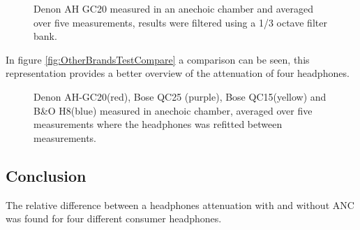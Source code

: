 \begin{figure}[H]
	\centering
	
	\caption{Denon AH GC20 measured in an anechoic chamber and averaged over five measurements, results were filtered using a 1/3 octave filter bank.}
	\label{fig:DenonComp}
\end{figure}

In figure \autoref{fig:OtherBrandsTestCompare} a comparison can be seen, this representation provides a better overview of the attenuation of four headphones.
\begin{figure}[H]
	\centering
	
	\caption{Denon AH-GC20(red), Bose QC25 (purple), Bose QC15(yellow) and B\&O H8(blue) measured in anechoic chamber, averaged over five measurements where the headphones was refitted between measurements.}
	\label{fig:OtherBrandsTestCompare}
\end{figure}


%	


\subsection{Conclusion}
The relative difference between a headphones attenuation with and without ANC was found for four different consumer headphones.



